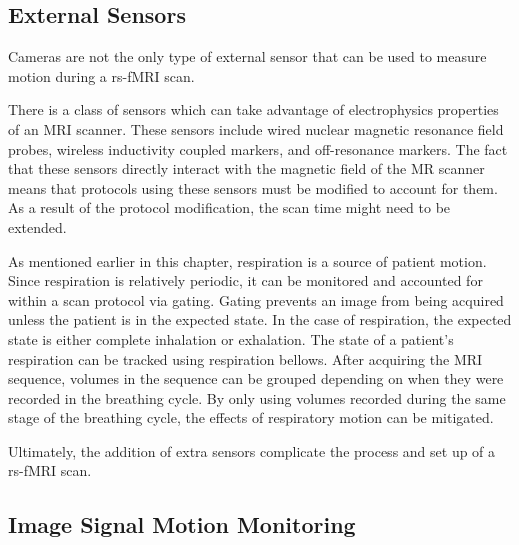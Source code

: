 \subsection{External Sensors}

Cameras are not the only type of external sensor that can be used to measure motion during a rs-fMRI scan. 

There is a class of sensors which can take advantage of electrophysics properties of an MRI scanner. These sensors include wired nuclear magnetic resonance field probes, wireless inductivity coupled markers, and off-resonance markers. %
The fact that these sensors directly interact with the magnetic field of the MR scanner means that protocols using these sensors must be modified to account for them. As a result of the protocol modification, the scan time might need to be extended.

As mentioned earlier in this chapter, respiration is a source of patient motion. Since respiration is relatively periodic, it can be monitored and accounted for within a scan protocol via gating. Gating prevents an image from being acquired unless the patient is in the expected state. In the case of respiration, the expected state is either complete inhalation or exhalation. The state of a patient's respiration can be tracked using respiration bellows. After acquiring the MRI sequence, volumes in the sequence can be grouped depending on when they were recorded in the breathing cycle. By only using volumes recorded during the same stage of the breathing cycle, the effects of respiratory motion can be mitigated.




Ultimately, the addition of extra sensors complicate the process and set up of a rs-fMRI scan.

\subsection{Image Signal Motion Monitoring}

